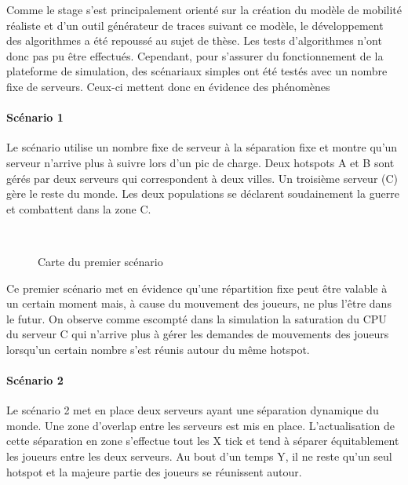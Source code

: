 Comme le stage s'est principalement orienté sur la création du modèle de mobilité réaliste et d'un outil générateur de traces suivant ce modèle, le développement des algorithmes a été repoussé au sujet de thèse.
Les tests d'algorithmes n'ont donc pas pu être effectués.
Cependant, pour s'assurer du fonctionnement de la plateforme de simulation, des scénariaux simples ont été testés avec un nombre fixe de serveurs.
Ceux-ci mettent donc en évidence des phénomènes

\paragraph{Scénario 1\\}
Le scénario utilise un nombre fixe de serveur à la séparation fixe et montre qu'un serveur n'arrive plus à suivre lors d'un pic de charge.
Deux hotspots A et B sont gérés par deux serveurs qui correspondent à deux villes.
Un troisième serveur (C) gère le reste du monde.
Les deux populations se déclarent soudainement la guerre et combattent dans la zone C.

\begin{figure}[h!]
	\centering
	\\[0.2cm]
	\caption{Carte du premier scénario}
	\label{fig:scenario_1}
\end{figure}

Ce premier scénario met en évidence qu'une répartition fixe peut être valable à un certain moment mais, à cause du mouvement des joueurs, ne plus l'être dans le futur.
On observe comme escompté dans la simulation la saturation du CPU du serveur C qui n'arrive plus à gérer les demandes de mouvements des joueurs lorsqu'un certain nombre s'est réunis autour du même hotspot.

\paragraph{Scénario 2\\}
Le scénario 2 met en place deux serveurs ayant une séparation dynamique du monde.
Une zone d'overlap entre les serveurs est mis en place.
L'actualisation de cette séparation en zone s'effectue tout les X tick et tend à séparer équitablement les joueurs entre les deux serveurs.
Au bout d'un temps Y, il ne reste qu'un seul hotspot et la majeure partie des joueurs se réunissent autour.

